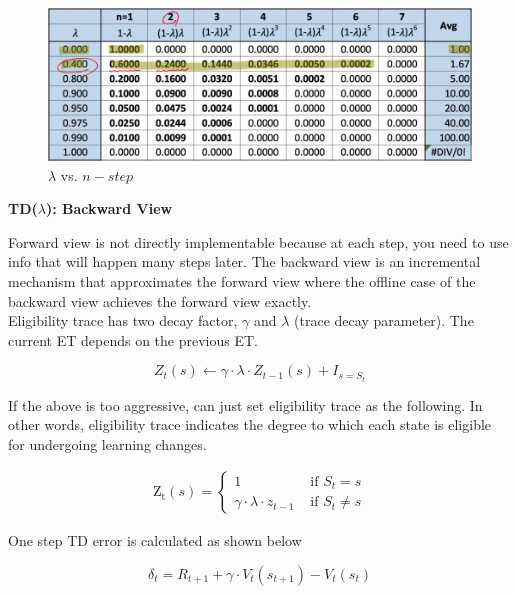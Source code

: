 \documentclass{article}
\begin{document}
\begin{figure}[h]
\includegraphics[scale=0.35]{lambda_vs_n}
\centering
\caption{$\lambda$ vs. $n-step$}
\end{figure}

\newpage
\noindent
\textbf{TD($\lambda$): Backward View}

\noindent
Forward view is not directly implementable because at each step, you need to use
info that will happen many steps later. The backward view is an incremental
mechanism that approximates the forward view where the offline case of the
backward view achieves the forward view exactly.\\

\noindent
Eligibility trace has two decay factor, $\gamma$ and $\lambda$ (trace decay
parameter). The current ET depends on the previous ET.  

\begin{equation}
Z_{t}(s) \leftarrow \gamma \cdot \lambda \cdot Z_{t-1}(s)+I_{s = S_{t}}
\end{equation}

\noindent
If the above is too aggressive, can just set eligibility trace as the following.
In other words, eligibility trace indicates the degree to which each state is
eligible for undergoing learning changes.

\begin{equation}
\begin{array}{l}
\operatorname{Z_{t}}(s) = \left\{\begin{array}{ll}
1 & \text { if } S_{t}=s \\
\gamma \cdot \lambda \cdot z_{t-1} & \text { if } S_{t} \neq s
\end{array}\right.
\end{array}
\end{equation}

\noindent
One step TD error is calculated as shown below

\begin{equation}
\delta_{t}=R_{t+1}+\gamma \cdot V_{t}\left(s_{t+1}\right)-V_{t}\left(s_{t}\right)
\end{equation}
\end{document}
